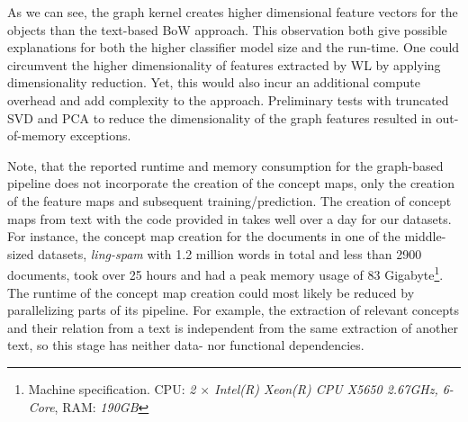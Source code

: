 As we can see, the graph kernel creates higher dimensional feature vectors for the objects than the text-based BoW approach. 
This observation both give possible explanations for both the higher classifier model size and the run-time.
One could circumvent the higher dimensionality of features extracted by WL by applying dimensionality reduction.
Yet, this would also incur an additional compute overhead and add complexity to the approach.
Preliminary tests with truncated SVD \cite{Mathematics2009} and PCA \cite{Jolliffe2002} to reduce the dimensionality of the graph features resulted in out-of-memory exceptions.

Note, that the reported runtime and memory consumption for the graph-based pipeline does not incorporate the creation of the concept maps, only the creation of the feature maps and subsequent training/prediction.
The creation of concept maps from text with the code provided in \cite{Falke2017b} takes well over a day for our datasets.
For instance, the concept map creation for the documents  in one of the middle-sized datasets, \textit{ling-spam} with 1.2 million words in total and less than 2900 documents, took over 25 hours and had a peak memory usage of 83 Gigabyte\footnote{Machine specification. CPU: \textit{2 $\times$ Intel(R) Xeon(R) CPU X5650 \@ 2.67GHz, 6-Core}, RAM: \textit{190GB}}.
The runtime of the concept map creation could most likely be reduced by parallelizing parts of its pipeline.
For example, the extraction of relevant concepts and their relation from a text is independent from the same extraction of another text, so this stage has neither data- nor functional dependencies.

